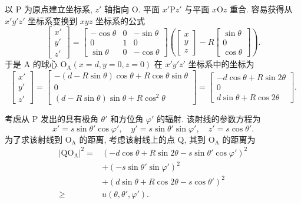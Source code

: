 \documentclass{article}
\begin{document}
以 $\mathrm P$ 为原点建立坐标系, $z'$ 轴指向 $\mathrm O$.
平面 $x'\mathrm Pz'$ 与平面 $x\mathrm Oz$ 重合.
容易获得从 $x'y'z'$ 坐标系变换到 $xyz$ 坐标系的公式
\begin{equation}
	\left[\begin{matrix}x'\\y'\\z'\end{matrix}\right]=
	\left[\begin{matrix}-\cos\theta&0&-\sin\theta\\0&1&0
	\\\sin\theta&0&-\cos\theta\end{matrix}\right]
	\left(\left[\begin{matrix}x\\y\\z\end{matrix}\right]-
	R\left[\begin{matrix}\sin\theta\\0\\\cos\theta\end{matrix}\right]\right).
\end{equation}
于是 A 的球心 $\mathrm O_\mathrm A\left(x=d,y=0,z=0\right)$
在 $x'y'z'$ 坐标系中的坐标为
\begin{equation}
	\left[\begin{matrix}x'\\y'\\z'\end{matrix}\right]=
	\left[\begin{matrix}
		-\left(d-R\sin\theta\right)\cos\theta+R\cos\theta\sin\theta
		\\0\\\left(d-R\sin\theta\right)\sin\theta+R\cos^2\theta
	\end{matrix}\right]=
	\left[\begin{matrix}
		-d\cos\theta+R\sin2\theta
		\\0\\d\sin\theta+R\cos2\theta
	\end{matrix}\right].
\end{equation}

考虑从 $\mathrm P$ 发出的具有极角 $\theta'$ 和方位角 $\varphi'$ 的辐射.
该射线的参数方程为
\begin{equation}
	x'=s\sin\theta'\cos\varphi',\quad
	y'=s\sin\theta'\sin\varphi',\quad
	z'=s\cos\theta'.
\end{equation}
为了求该射线到 $\mathrm O_\mathrm A$ 的距离, 考虑该射线上的点 $\mathrm Q$,
其到 $\mathrm O_\mathrm A$ 的距离为
\begin{equation}\begin{split}
	\left|\mathrm{QO_A}\right|^2=
	&\left(-d\cos\theta+R\sin2\theta-s\sin\theta'\cos\varphi'\right)^2\\
	&+\left(-s\sin\theta'\sin\varphi'\right)^2\\
	&+\left(d\sin\theta+R\cos2\theta-s\cos\theta'\right)^2\\
	\ge&u\!\left(\theta,\theta',\varphi'\right).
\end{split}\end{equation}
\end{document}
